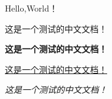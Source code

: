 \documentclass[12pt,a4paper]{article}
\begin{document}
 

Hello,World！  

这是一个测试的中文文档！  

\textbf{这是一个测试的中文文档！}

\underline{这是一个测试的中文文档！}

\emph{这是一个测试的中文文档！}  
\end{document}
